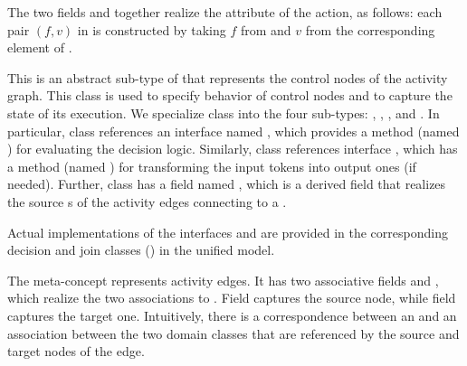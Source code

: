 \begin{description}
	The two fields  and    together realize the attribute  of the action, as follows: each pair $ (f,v) $ in  is constructed by taking $f$ from  and $v$ from the corresponding element of .
	\item[\clazz{ControlNode}.] This is an abstract sub-type of  that represents the control nodes of the activity graph. This class is used to specify behavior of control nodes and to capture the state of its execution. We specialize class  into the four sub-types: , , , and . 
	In particular, class  references an interface named , which provides a method (named ) for evaluating the decision logic. Similarly, class  references interface , which has a method (named ) for transforming the input tokens into output ones (if needed).
	Further, class  has a field named , which is a derived field that realizes the source s of the activity edges connecting to a .
	
	Actual implementations of the interfaces  and  are provided in the corresponding decision and join classes (\resp) in the unified model.
	\item[\clazz{Edge}.] The  meta-concept represents activity edges. It has two associative fields  and , which realize the two associations to . Field  captures the source node, while field  captures the target one. Intuitively, there is a correspondence between an  and an association between the two domain classes that are referenced by the source and target nodes of the edge.
\end{description}
%
%
%

